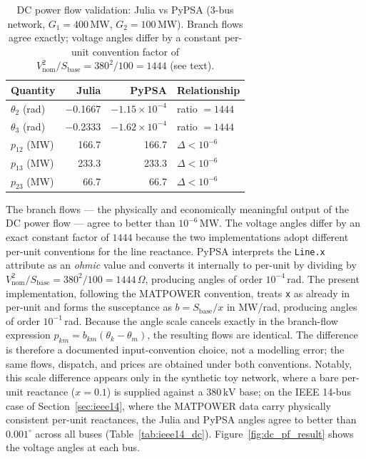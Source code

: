 \begin{table}[H]
\centering
\caption{DC power flow validation: Julia vs PyPSA (3-bus network, $G_1 = 400\,\text{MW}$, $G_2 = 100\,\text{MW}$). Branch flows agree exactly; voltage angles differ by a constant per-unit convention factor of $V_\text{nom}^2/S_\text{base} = 380^2/100 = 1444$ (see text).}
\label{tab:dc_validation}
\begin{tabular}{lrrl}
\toprule
\textbf{Quantity} & \textbf{Julia} & \textbf{PyPSA} & \textbf{Relationship} \\
\midrule
$\theta_2$ (rad)   & $-$0.1667 & $-1.15\times10^{-4}$ & ratio $= 1444$ \\
$\theta_3$ (rad)   & $-$0.2333 & $-1.62\times10^{-4}$ & ratio $= 1444$ \\
$p_{12}$ (MW)      &  166.7    &  166.7    & $\Delta < 10^{-6}$ \\
$p_{13}$ (MW)      &  233.3    &  233.3    & $\Delta < 10^{-6}$ \\
$p_{23}$ (MW)      &   66.7    &   66.7    & $\Delta < 10^{-6}$ \\
\bottomrule
\end{tabular}
\end{table}

The branch flows --- the physically and economically meaningful output of the DC power flow --- agree to better than $10^{-6}\,\text{MW}$. The voltage angles differ by an exact constant factor of $1444$ because the two implementations adopt different per-unit conventions for the line reactance. PyPSA interprets the \texttt{Line.x} attribute as an \emph{ohmic} value and converts it internally to per-unit by dividing by $V_\text{nom}^2/S_\text{base} = 380^2/100 = 1444\,\Omega$, producing angles of order $10^{-4}$\,rad. The present implementation, following the MATPOWER convention, treats \texttt{x} as already in per-unit and forms the susceptance as $b = S_\text{base}/x$ in MW/rad, producing angles of order $10^{-1}$\,rad. Because the angle scale cancels exactly in the branch-flow expression $p_{km} = b_{km}(\theta_k - \theta_m)$, the resulting flows are identical. The difference is therefore a documented input-convention choice, not a modelling error; the same flows, dispatch, and prices are obtained under both conventions. Notably, this scale difference appears only in the synthetic toy network, where a bare per-unit reactance ($x = 0.1$) is supplied against a $380\,\text{kV}$ base; on the IEEE 14-bus case of Section~\ref{sec:ieee14}, where the MATPOWER data carry physically consistent per-unit reactances, the Julia and PyPSA angles agree to better than $0.001^\circ$ across all buses (Table~\ref{tab:ieee14_dc}). Figure~\ref{fig:dc_pf_result} shows the voltage angles at each bus.

